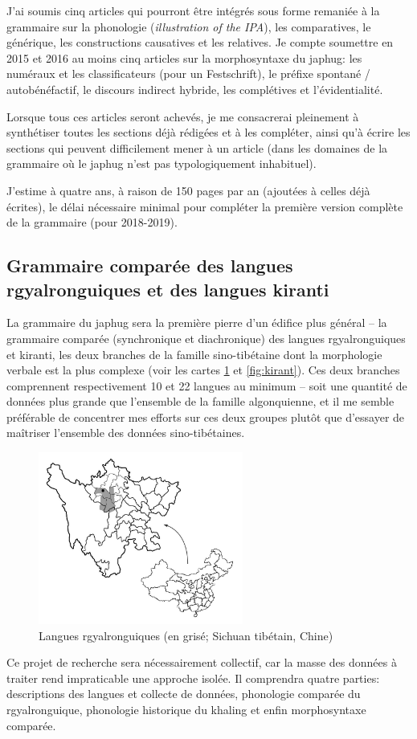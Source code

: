 \documentclass[oldfontcommands,oneside,a4paper,11pt]{article}
\begin{document}
  J'ai soumis cinq articles qui pourront être intégrés sous forme remaniée à la grammaire sur la phonologie (\textit{illustration of the IPA}), les comparatives, le générique, les constructions causatives et les relatives. Je compte soumettre en 2015 et 2016 au moins cinq articles sur la morphosyntaxe du japhug: les numéraux et les classificateurs (pour un Festschrift), le préfixe spontané / autobénéfactif, le discours indirect hybride, les complétives et l'évidentialité. 
  
  Lorsque tous ces articles seront achevés, je me consacrerai pleinement  à synthétiser toutes les sections déjà rédigées et à les compléter, ainsi qu'à écrire les sections qui peuvent difficilement mener à un article (dans les domaines de la grammaire où le japhug n'est pas typologiquement inhabituel).

J'estime à quatre ans, à raison de 150 pages par an (ajoutées à celles déjà écrites), le délai nécessaire minimal pour compléter la première version complète de la grammaire (pour 2018-2019).

\subsection{Grammaire comparée des langues rgyalronguiques et des langues kiranti}
La grammaire du japhug sera la première pierre d'un édifice plus général -- la grammaire comparée (synchronique et diachronique) des langues rgyalronguiques et kiranti, les deux branches de la famille sino-tibétaine dont la morphologie verbale est la plus complexe (voir les cartes  \ref{fig:rgy}  et \ref{fig:kirant}). Ces deux branches comprennent respectivement 10 et 22 langues au minimum -- soit une quantité de données plus grande que l'ensemble de la famille algonquienne, et il me semble préférable de concentrer mes efforts sur ces deux groupes plutôt que d'essayer de maîtriser l'ensemble des données sino-tibétaines.

   \begin{figure}[h]
   \caption{Langues rgyalronguiques (en grisé; Sichuan tibétain, Chine) }  \label{fig:rgy}  \centering
 \includegraphics[width=0.6\textwidth]{carte.JPG}
 \end{figure}
Ce projet de recherche sera nécessairement collectif, car la masse des données à traiter rend impraticable une approche isolée. Il comprendra quatre parties: descriptions des langues et collecte de données, phonologie comparée du rgyalronguique, phonologie historique du khaling et enfin morphosyntaxe comparée.
\end{document}
